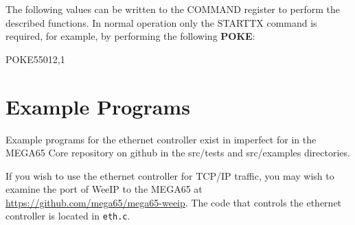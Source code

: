 The following values can be written to the COMMAND register to perform the described functions.
In normal operation only the STARTTX command is required, for example, by performing the following {\bf POKE}:

\begin{screenoutput}
POKE55012,1
\end{screenoutput}



\section{Example Programs}

Example programs for the ethernet controller exist in imperfect for in the MEGA65 Core repository on github in the src/tests and src/examples directories.

If you wish to use the ethernet controller for TCP/IP traffic, you may wish to examine the port of WeeIP to the MEGA65 at
\url{https://github.com/mega65/mega65-weeip}.  The code that controls the ethernet controller is located in {\tt eth.c}.
